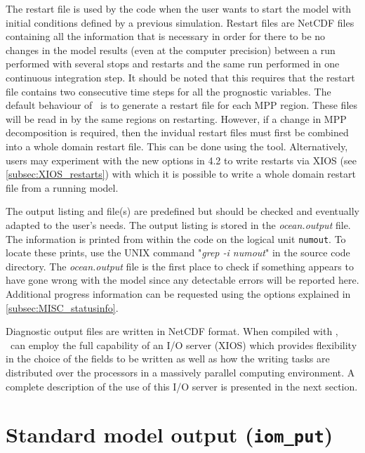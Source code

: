 \documentclass[../main/NEMO_manual]{subfiles}
\begin{document}
The restart file is used by the code when the user wants to start the model with initial
conditions defined by a previous simulation.  Restart files are NetCDF files containing
all the information that is necessary in order for there to be no changes in the model
results (even at the computer precision) between a run performed with several stops and
restarts and the same run performed in one continuous integration step.  It should be
noted that this requires that the restart file contains two consecutive time steps for all
the prognostic variables. The default behaviour of \NEMO\ is to generate a restart file
for each MPP region. These files will be read in by the same regions on restarting.
However, if a change in MPP decomposition is required, then the invidual restart files
must first be combined into a whole domain restart file. This can be done using the
 tool.  Alternatively, users may experiment with the new options in
4.2 to write restarts via XIOS (see \autoref{subsec:XIOS_restarts}) with which it is possible to
write a whole domain restart file from a running model.

The output listing and file(s) are predefined but should be checked and eventually adapted
to the user's needs.  The output listing is stored in the \textit{ocean.output} file.  The
information is printed from within the code on the logical unit \texttt{numout}.  To
locate these prints, use the UNIX command "\textit{grep -i numout}" in the source code
directory. The \textit{ocean.output} file is the first place to check if something appears
to have gone wrong with the model since any detectable errors will be reported here.
Additional progress information can be requested using the options explained in
\autoref{subsec:MISC_statusinfo}.

Diagnostic output files are written in NetCDF format.  When compiled with ,
\NEMO\ can employ the full capability of an I/O server (XIOS)  which provides flexibility
in the choice of the fields to be written as well as how the writing tasks are distributed
over the processors in a massively parallel computing environment.  A complete description
of the use of this I/O server is presented in the next section.


\section{Standard model output (\texttt{iom\_put})}
\label{sec:DIA_iom}
\end{document}

